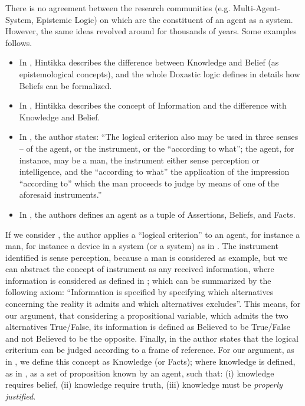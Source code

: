 There is no agreement between the research communities (e.g.
Multi-Agent-System, Epistemic Logic) on which are the constituent of an agent
as a system. However, the same ideas revolved around for thousands of years.
Some examples follows.
\begin{itemize}
	\item In \autocite{Hintikka1962knowledge}, Hintikka describes the
		difference between Knowledge and Belief (as epistemological
		concepts), and the whole Doxastic logic defines in details how
		Beliefs can be formalized.
	\item In \autocite{Hintikka1993Information}, Hintikka describes the concept
		of Information and the difference with Knowledge and Belief.
	\item In \autocite{Empiricus1990Pyrrhonism}, the author states: ``The
		logical criterion also may be used in three senses -- of the
		agent, or the instrument, or the ``according to what''; the
		agent, for instance, may be a man, the instrument either sense
		perception or intelligence, and the ``according to what'' the
		application of the impression ``according to'' which the man
		proceeds to judge by means of one of the aforesaid
		instruments.'' 
	\item In \autocite{Santaca2016abf}, the authors defines an agent as a
		tuple of Assertions, Beliefs, and Facts.
\end{itemize}

If we consider \autocite{Empiricus1990Pyrrhonism}, the author applies a
``logical criterion'' to an agent, for instance a man, for instance a device in
a system (or a system) as in \autocite{Santaca2016abf}.  The instrument identified is sense
perception, because a man is considered as example, but we can abstract the
concept of instrument as any received information, where information is
considered as defined in \autocite{Hintikka1993Information}; which can be
summarized by the following axiom: ``Information is specified by specifying
which alternatives concerning the reality it admits and which alternatives
excludes''. This means, for our argument, that considering a propositional
variable, which admits the two alternatives True/False, its information is
defined as Believed to be True/False and not Believed to be the opposite. 
Finally, in \autocite{Empiricus1990Pyrrhonism}
the author states that the logical criterium can be judged according to a frame of reference.
For our argument, as in \autocite{Santaca2016abf}, we define this concept
as Knowledge (or Facts); where knowledge is defined, as in \autocite{Steup2020epistemology}, as
a set of proposition known by an agent, such that: (i) knowledge requires belief,
(ii) knowledge require truth, (iii) knowledge must be \emph{properly justified}.

